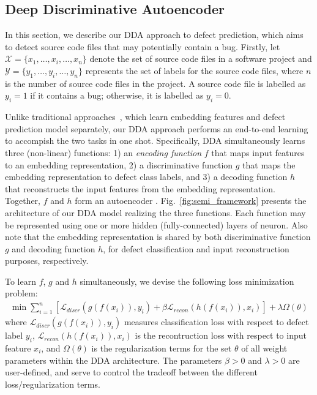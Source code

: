 \subsection{Deep Discriminative Autoencoder}
\label{sec:semi}
In this section, we describe our DDA approach to defect prediction, which aims to detect source code files that may potentially contain a bug. Firstly, let $\mathcal{X}=\{x_1, \dots, x_i, \dots, x_n\}$ denote the set of source code files in a software project and $\mathcal{Y}=\{y_1, \dots, y_i, \dots, y_n\}$ represents the set of labels for the source code files, where $n$ is the number of source code files in the project. A source code file is labelled as $y_{i}=1$ if it contains a bug; otherwise, it is labelled as $y_i = 0$. 

Unlike traditional approaches~\cite{yang2015deep, wang2016automatically}, which learn embedding features and defect prediction model separately, our DDA approach performs an end-to-end learning to accompish the two tasks in one shot. Specifically, DDA simultaneously learns three (non-linear) functions: 1) an \emph{encoding function} $f$ that maps input features to an embedding representation, 2) a discriminative function $g$ that maps the embedding representation to defect class labels, and 3) a decoding function $h$ that reconstructs the input features from the embedding representation. Together, $f$ and $h$ form an autoencoder \cite{Vincent2010}. Fig.~\ref{fig:semi_framework} presents the architecture of our DDA model realizing the three functions. Each function may be represented using one or more hidden (fully-connected) layers of neuron. Also note that the embedding representation is shared by both discriminative function $g$ and decoding function $h$, for defect classification and input reconstruction purposes, respectively. 


To learn $f$, $g$ and $h$ simultaneously, we devise the following loss minimization problem:
\begin{align}
\label{eq:loss}
\min \sum_{i=1}^{n} \left[ \mathcal{L}_{discr}(g(f(x_i)), y_i) + \beta \mathcal{L}_{recon}(h(f(x_i)), x_i) \right] + \lambda \Omega(\theta)
\end{align}
where $\mathcal{L}_{discr}(g(f(x_i)), y_i)$ measures classification loss with respect to defect label $y_i$, $\mathcal{L}_{recon}(h(f(x_i)), x_i)$ is the recontruction loss with respect to input feature $x_i$, and $\Omega(\theta)$ is the regularization terms for the set $\theta$ of all weight parameters within the DDA architecture. The parameters $\beta > 0$ and $\lambda > 0$ are user-defined, and serve to control the tradeoff between the different loss/regularization terms.

